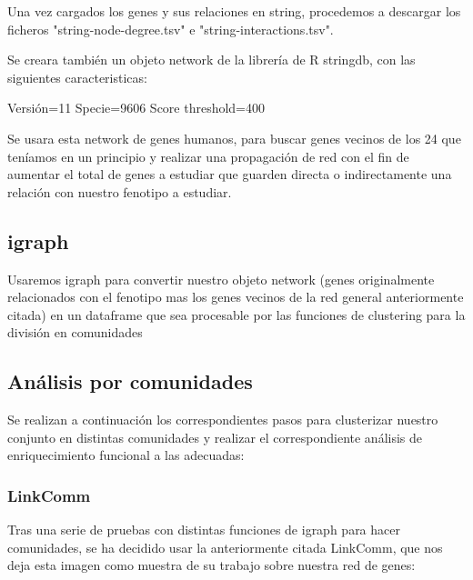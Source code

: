 Una vez cargados los genes y sus relaciones en string, procedemos a descargar los ficheros "string-node-degree.tsv" e "string-interactions.tsv".

Se creara también un objeto network de la librería de R stringdb, con las siguientes caracteristicas:

Versión=11
Specie=9606
Score threshold=400

\hfill

Se usara esta network de genes humanos, para buscar genes vecinos de los 24 que teníamos en un principio y realizar una propagación de red con el fin de aumentar el total de genes a estudiar que guarden directa o indirectamente una relación con nuestro fenotipo a estudiar.

\hfill

\subsection{igraph}

Usaremos igraph para convertir nuestro objeto network (genes originalmente relacionados con el  fenotipo mas los genes vecinos de la red general anteriormente citada) en un dataframe que sea procesable por las funciones de clustering para la división en comunidades

\hfill

\subsection{Análisis por comunidades}

Se realizan a continuación los correspondientes pasos para clusterizar nuestro conjunto en distintas comunidades y realizar el correspondiente análisis de enriquecimiento funcional a las adecuadas:

\subsubsection{LinkComm}

Tras una serie de pruebas con distintas funciones de igraph para hacer comunidades, se ha decidido usar la anteriormente citada LinkComm, que nos deja esta imagen como muestra de su trabajo sobre nuestra red de genes: 

